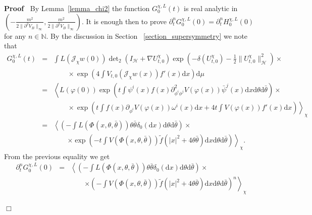 \documentclass[a4paper,10pt]{article}
\newcommand{\mathd}{\mathrm{d}}
\newenvironment{proof}{\noindent\textbf{Proof\ }}{\hspace*{\fill}$\Box$\medskip}
\begin{document}
\begin{proof}
  By Lemma~\ref{lemma_chi2} the function $G^{\chi, L}_0 (t)$ is real analytic
  in $\left( - \frac{m^2}{2 \| \partial^2 V_B \|_{\infty}}, \frac{m^2}{2 \|
  \partial^2 V_B \|_{\infty}} \right)$. It is enough then to prove
  $\partial^n_t G_0^{\chi, L} (0) = \partial^n_t H_0^{\chi, L} (0)$ for any $n
  \in \mathbb{N}$. By the discussion in Section ~\ref{section_supersymmetry}
  we note that
  \begin{eqnarray}
    G^{\chi, L}_0 (t) & = & \int L (\mathcal{J}_{\chi} w (0)) \det\nolimits_2
    (I_{\mathcal{H}} + \nabla U_{t, 0}^{\chi}) \exp \left( - \delta
    (U^{\chi}_{t, 0}) - \frac{1}{2} \|U_{t, 0}^{\chi} \|^2_{\mathcal{H}}
    \right) \times \nonumber\\
    &  & \quad \quad \times \exp \left( 4 \int V_{t, 0} (\mathcal{J}_{\chi} w
    (x)) f' (x) \mathd x \right) \mathd \mu \nonumber\\
    & = & \left\langle L (\varphi (0)) \exp \left( t \int \psi^i (x) f (x)
    \partial^2_{\phi^i \phi^j} V (\varphi (x)) \bar{\psi}^j (x) \mathd x
    \mathd \theta \mathd \bar{\theta} \right) \right. \times \nonumber\\
    &  & \quad \quad \times \left. \exp \left( t \int f (x) \partial_{\phi^i}
    V (\varphi (x)) \omega^i (x) \mathd x + 4 t \int V (\varphi (x)) f' (x)
    \mathd x \right) \right\rangle_{\chi} \nonumber\\
    & = & \left\langle \left( - \int L (\Phi_{} (x, \theta, \bar{\theta}))
    \theta \bar{\theta} \delta_0 (\mathd x) \mathd \theta \mathd \bar{\theta}
    \right) \times \right. \nonumber\\
    &  & \quad \quad \left. \times \exp \left( - t \int V (\Phi (x, \theta,
    \bar{\theta})) \tilde{f} (| x |^2 + 4 \theta \bar{\theta}) \mathd x \mathd
    \theta \mathd \bar{\theta} \right) \right\rangle_{\chi} . \nonumber
  \end{eqnarray}
  From the previous equality we get
  \[ \begin{array}{lll}
       \partial^n_t G^{\chi, L}_0 (0) & = & \left\langle \left( - \int L (\Phi
       (x, \theta, \bar{\theta})) \theta \bar{\theta} \delta_0 (\mathd x)
       \mathd \theta \mathd \bar{\theta} \right) \times \right.\\
       &  & \qquad \left. \times \left( - \int V (\Phi (x, \theta,
       \bar{\theta})) \tilde{f} (| x |^2 + 4 \theta \bar{\theta}) \mathd x
       \mathd \theta \mathd \bar{\theta} \right)^n \right\rangle_{\chi}
     \end{array} \]

\end{proof}
\end{document}
